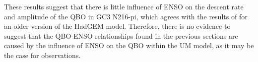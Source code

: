 These results suggest that there is little influence of ENSO on the descent rate and amplitude of the QBO in GC3 N216-pi, which agrees with the results of \cite{serva2020} for an older version of the HadGEM model. 
Therefore, there is no evidence to suggest that the QBO-ENSO relationships found in the previous sections are caused by the influence of ENSO on the QBO within the UM model, as it may be the case for observations.

%
%
%
%
%
%
